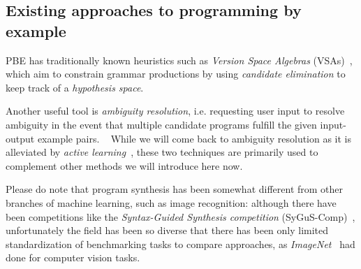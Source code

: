 \documentclass{article}
\begin{document}
\subsection{Existing approaches to programming by example} \label{sec:pbe}

PBE has traditionally known heuristics such as
\emph{Version Space Algebras} (VSAs)~\citep{mitchell1982generalization},
which aim to constrain grammar productions by using
\emph{candidate elimination} to keep track of a \emph{hypothesis space}.

Another useful tool is \emph{ambiguity resolution},
i.e. requesting user input to resolve ambiguity
in the event that multiple candidate programs
fulfill the given input-output example pairs.%
~\citep{gulwani2017program}
While we will come back to ambiguity resolution as it is
alleviated by \emph{active learning}~\citep{settles2009active},
these two techniques are primarily used to complement
other methods we will introduce here now.

Please do note that program synthesis has been somewhat different
from other branches of machine learning, such as image recognition:
although there have been competitions like the
\emph{Syntax-Guided Synthesis competition} (SyGuS-Comp)~\citep{sygus},
unfortunately the field has been so diverse that there has been only limited
standardization of benchmarking tasks to compare approaches,
as \emph{ImageNet}~\citep{deng2009imagenet} had done for computer vision tasks.%



\end{document}
